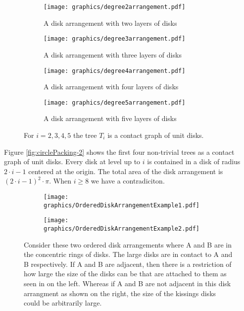 \documentclass[10pt]{CSUNthesis}
\theoremstyle{plain}%
\theoremstyle{definition}
\theoremstyle{remark}
\begin{document}
\begin{figure}[!htpb]\label{fig:circlePacking-2}
\begin{center}
  \begin{subfigure}[b]{0.24\textwidth}
	  \texttt{[image: graphics/degree2arrangement.pdf]}
	  \caption{A disk arrangement with two layers of disks}
	  \label{fig:circlePacking2-1}
  \end{subfigure}
  \begin{subfigure}[b]{0.24\textwidth}
	  \texttt{[image: graphics/degree3arrangement.pdf]}
	  \caption{A disk arrangement with three layers of disks}
	  \label{fig:circlePacking2-2}
  \end{subfigure}
  \begin{subfigure}[b]{0.24\textwidth}
	  \texttt{[image: graphics/degree4arrangement.pdf]}
	  \caption{A disk arrangement with four layers of disks}
	  \label{fig:circlePacking2-3}
  \end{subfigure}
  \begin{subfigure}[b]{0.24\textwidth}
	  \texttt{[image: graphics/degree5arrangement.pdf]}
	  \caption{A disk arrangement with five layers of disks}
	  \label{fig:circlePacking2-4}
  \end{subfigure}
\end{center} 
\caption{For $i=2,3,4,5$ the tree $T_i$ is a contact graph of unit disks.}
\end{figure}
Figure \ref{fig:circlePacking-2} shows the first four non-trivial trees as a contact graph of unit disks.
Every disk at level up to $i$ is contained in a disk of radius $2\cdot i - 1$ centered at the origin.
The total area of the disk arrangement is $(2\cdot i -1)^2 \cdot \pi$. 
When $i\geq 8$ we have a contradiciton.

\begin{figure}[!htbp]
\begin{center}
  \begin{subfigure}[b]{.48\textwidth}
  \begin{center}
	  \texttt{[image: graphics/OrderedDiskArrangementExample1.pdf]}
	  \label{fig:circlePacking3-1}
	  \end{center}
  \end{subfigure}
  \begin{subfigure}[b]{0.48\textwidth}
  \begin{center}
	  \texttt{[image: graphics/OrderedDiskArrangementExample2.pdf]}	  
	  \label{fig:circlePacking3-2}
	  \end{center}
  \end{subfigure}
  \caption{Consider these two ordered disk arrangements where A and B are in the concentric rings of disks.  The large disks are in contact to A and B respectively.  
  If A and B are adjacent, then there is a restriction of how large the size of the disks can be that are attached to them as seen in on the left.  
  Whereas if A and B are not adjacent in this disk arrangment as shown on the right, the size of the kissings disks could be arbitrarily large.}\label{fig:circlePacking-3}
\end{center} 
\end{figure}
\end{document}
